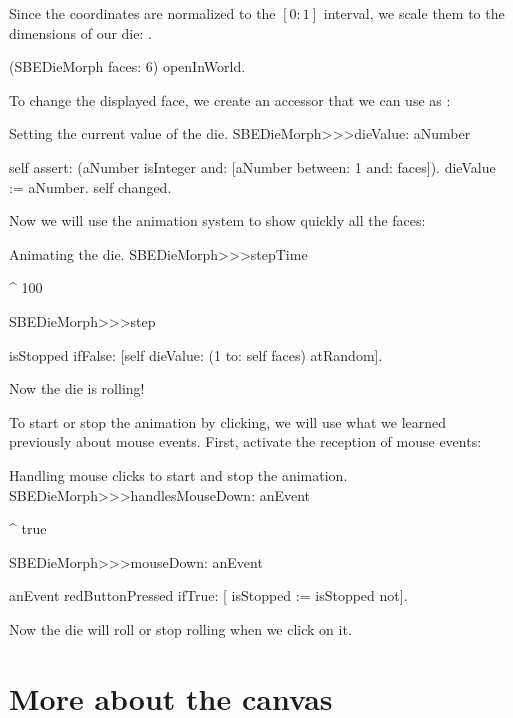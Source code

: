 \documentclass[a4paper,10pt,twoside]{book}
\begin{document}
Since the coordinates are normalized to the $[0{:}1]$ interval, we scale them to the dimensions of our die: .

\begin{code}{}
(SBEDieMorph faces: 6) openInWorld.
\end{code}

To change the displayed face, we create an accessor that we can use as :
\begin{method}{Setting the current value of the die.}
SBEDieMorph>>>dieValue: aNumber

	self assert: (aNumber isInteger and: [aNumber between: 1 and: faces]).
	dieValue := aNumber.
	self changed.
\end{method}

Now we will use the animation system to show quickly all the faces:
\begin{methods}{Animating the die.}
SBEDieMorph>>>stepTime

	^ 100


SBEDieMorph>>>step

	isStopped ifFalse: [self dieValue: (1 to: self faces) atRandom].
\end{methods}
Now the die is rolling!

To start or stop the animation by clicking, we will use what we learned previously about mouse events.
First, activate the reception of mouse events:

\begin{methods}{Handling mouse clicks to start and stop the animation.}
SBEDieMorph>>>handlesMouseDown: anEvent

	^ true


SBEDieMorph>>>mouseDown: anEvent

	anEvent redButtonPressed ifTrue: [
		isStopped := isStopped not].
\end{methods}
Now the die will roll or stop rolling when we click on it.


\section{More about the canvas}
\end{document}
